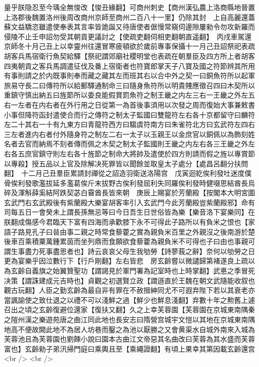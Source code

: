 量乎朕隐忍至今瑀全無悛改【悛丑緣翻】可商州刺史【商州漢弘農上洛商縣地晉置上洛郡後魏置洛州後周改商州京師至商州二百八十一里】仍除其封　上自高麗還蓋蘇文益驕恣雖遣使奉表其言率皆詭誕又待唐使者倨慢常窺伺邊隙屢勑令勿攻新羅而侵陵不止壬申詔勿受其朝貢更議討之【使疏吏翻伺相吏翻朝直遥翻】　丙戌車駕還京師冬十月己丑上以幸靈州往還冒寒疲頓欲於歲前專事保攝十一月己丑詔祭祀表疏胡客兵馬宿衛行魚契給驛【祭祀謂郊廟社稷明堂也表疏在朝羣臣及四方所上者胡客四夷朝貢之客兵馬調遣征伐及番上宿衛者也符寶郎掌天子八寶及國之符節辨其所用有事則請之於内既事則奉而藏之藏其左而班其右以合中外之契一曰銅魚符所以起軍旅易守長二曰傳符所以給郵驛通制命三曰隨身魚符所以明貴賤應徵召四曰木契所以重鎮守慎出納五曰旌節所以委良能假賞罰魚符之制王畿之内左三右一王畿之外左五右一左者在内右者在外行用之日從第一為首後事須用以次發之周而復始大事兼敕書小事但降符函封遣使合而行之傳符之制太子監國曰雙龍符左右各十京都留守曰麟符左二十其右一十有九東方曰青龍符西方曰騶虞符南方曰朱雀符北方曰玄武符左四右三左者進内右者付外隨身符之制左二右一太子以玉親王以金庶官以銅佩以為飾刻姓名者去官而納焉不刻者傳而佩之木契之制太子監國則王畿之内左右各三王畿之外左右各五庶官鎮守則左右各十旌節之制命大將帥及遣使於四方則請而假之旌以專賞節以專殺】授五品以上官及除解决死罪皆以聞餘並取皇太子處分【處昌呂翻分扶問翻】　十二月己丑羣臣累請封禪從之詔造羽衛送洛陽宫　戊寅迴紇俟利發吐迷度僕骨俟利發歌濫拔延多濫葛俟斤末拔野古俟利發屈利失同羅俟利發時健啜思結酋長烏碎及渾斛薛奚結阿跌契苾白霫酋長皆來朝　庚辰上賜宴於芳蘭殿【按閣本大明宮圖玄武門右玄武殿後有紫蘭殿大樂宴胡客率引入玄武門今此芳蘭殿豈紫蘭殿邪】命有司每五日一會癸未上謂長孫無忌等曰今日吾生日世俗皆為樂【樂音洛下宴樂同】在朕翻成傷感今君臨天下富有四海而承歡膝下永不可得此子路所以有負米之恨也【家語子路見孔子曰㫺由事二親之時常食藜藿之實為親負米百里之外親沒之後南游於楚後車百乘積粟萬鍾累茵而坐列鼎而食願欲食藜藿為親負米不可得也子曰由也事親可謂生事盡力死事盡思者也】詩云哀哀父母生我劬勞【詩蓼莪之辭】奈何以劬勞之日更為宴樂乎因泣數行下【行戶剛翻】左右皆悲　房玄齡嘗以微譴歸第褚遂良上疏以為玄齡自義旗之始翼贊聖功【謂謁見於軍門署為記室時也上時掌翻】武悳之季冒死决策【謂誅建成元吉時也】貞觀之初選賢立政【謂遜直於王魏在朝文武隨能收叙也觀古玩翻】人臣之勤玄齡為最自非有罪在不赦搢紳同尤不可遐弃陛下若以其衰老亦當諷諭使之致仕退之以禮不可以淺鮮之過【鮮少也鮮息淺翻】弃數十年之勲舊上遽召出之頃之玄齡復避位還家【復扶又翻】久之上幸芙蓉園【芙蓉園在京城東南隅秦之隑州漢之樂遊苑唐之曲江同此地也長安志曰隋營宫城宇文愷以其地在京城東南隅地高不便故闕此地不為居人坊巷而鑿之為池以厭勝之又會黄渠水自城外南來入城為芙蓉池且為芙蓉園也劉餗小說曰園本古曲江文帝惡其名曲改曰芙蓉為其水盛而芙蓉富也】玄齡勑子弟汛掃門庭曰乘輿且至【乘繩證翻】有頃上果幸其第因載玄齡還宫<br />
<br />
